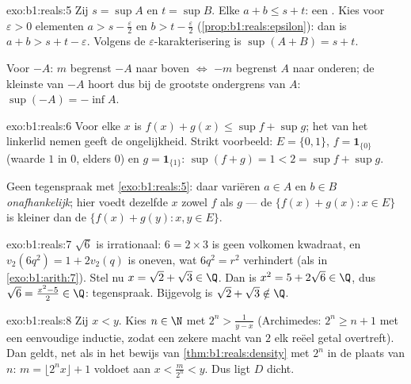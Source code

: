 \begin{solution}{exo:b1:reals:5}
Zij $s = \sup A$ en $t = \sup B$. Elke $a + b \leq s + t$: een
. Kies voor $\varepsilon > 0$ elementen $a > s -
\frac\varepsilon2$ en $b > t - \frac\varepsilon2$
(\cref{prop:b1:reals:epsilon}): dan is $a + b > s + t - \varepsilon$.
Volgens de $\varepsilon$-karakterisering is $\sup(A+B) = s + t$.

Voor $-A$: $m$ begrenst $-A$ naar boven $\iff$ $-m$ begrenst $A$ naar
onderen; de kleinste  van $-A$ hoort dus bij de grootste
ondergrens van $A$: $\sup(-A) = -\inf A$.
\end{solution}

\begin{solution}{exo:b1:reals:6}
Voor elke $x$ is $f(x) + g(x) \leq \sup f + \sup g$; het  van het
linkerlid nemen geeft de ongelijkheid. Strikt voorbeeld: $E = \{0, 1\}$,
$f = \mathbf{1}_{\{0\}}$ (waarde $1$ in $0$, elders $0$) en $g =
\mathbf{1}_{\{1\}}$: $\sup(f + g) = 1 < 2 = \sup f + \sup g$.

Geen tegenspraak met \cref{exo:b1:reals:5}: daar variëren $a \in A$ en $b
\in B$ \emph{onafhankelijk}; hier voedt dezelfde $x$ zowel $f$ als $g$
--- de  $\{f(x) + g(x) : x \in E\}$ is kleiner dan de
 $\{f(x) + g(y) : x, y \in E\}$.
\end{solution}

\begin{solution}{exo:b1:reals:7}
$\sqrt 6$ is irrationaal: $6 = 2 \times 3$ is geen volkomen kwadraat, en
$v_2(6q^2) = 1 + 2v_2(q)$ is oneven, wat $6q^2 = r^2$ verhindert (als in
\cref{exo:b1:arith:7}). Stel nu $x = \sqrt 2 + \sqrt 3 \in \Q$. Dan is
$x^2 = 5 + 2\sqrt 6 \in \Q$, dus $\sqrt 6 = \frac{x^2 - 5}{2} \in \Q$:
tegenspraak. Bijgevolg is $\sqrt 2 + \sqrt 3 \notin \Q$.
\end{solution}

\begin{solution}{exo:b1:reals:8}
Zij $x < y$. Kies $n \in \N$ met $2^n > \frac{1}{y - x}$ (Archimedes:
$2^n \geq n + 1$ met een eenvoudige inductie, zodat een zekere macht van
$2$ elk reëel getal overtreft). Dan geldt, net als in het bewijs van
\cref{thm:b1:reals:density} met $2^n$ in de plaats van $n$: $m = \lfloor
2^n x \rfloor + 1$ voldoet aan $x < \frac{m}{2^n} < y$. Dus ligt $D$
dicht.
\end{solution}

